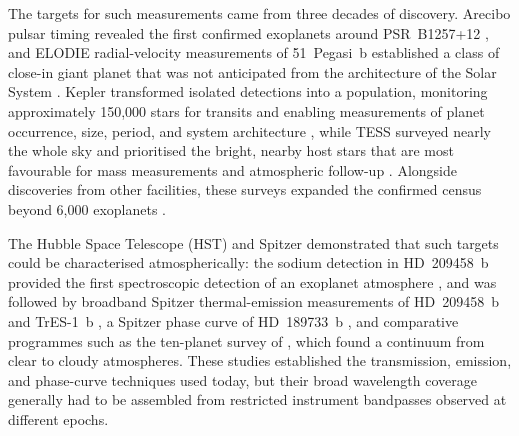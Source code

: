 The targets for such measurements came from three decades of discovery.
Arecibo pulsar timing revealed the first confirmed exoplanets around
PSR~B1257+12 \citep{WolszczanFrail1992}, and ELODIE radial-velocity
measurements of 51~Pegasi~b established a class of close-in giant planet that
was not anticipated from the architecture of the Solar System
\citep{MayorQueloz1995}. Kepler transformed
isolated detections into a population, monitoring approximately 150,000 stars
for transits and enabling measurements of planet occurrence, size, period, and
system architecture \citep{BoruckiEtAl2010,WinnFabrycky2015}, while TESS
surveyed nearly the whole sky and prioritised the bright, nearby host stars
that are most favourable for mass measurements and atmospheric follow-up
\citep{RickerEtAl2015}. Alongside discoveries from other facilities, these
surveys expanded the confirmed census beyond 6,000 exoplanets
\citep{NASAExoplanetArchive2026}.


The Hubble Space Telescope (HST) and Spitzer demonstrated that such targets
could be characterised atmospherically: the sodium detection in HD~209458~b
provided the first spectroscopic detection of an exoplanet atmosphere
\citep{CharbonneauEtAl2002}, and was followed by broadband Spitzer
thermal-emission measurements of HD~209458~b and TrES-1~b
\citep{DemingEtAl2005,CharbonneauEtAl2005}, a Spitzer phase curve of
HD~189733~b \citep{KnutsonEtAl2007}, and comparative programmes such as the
ten-planet survey of \citet{SingEtAl2016}, which found a continuum from clear
to cloudy atmospheres. These studies established the transmission, emission,
and phase-curve techniques used today, but their broad wavelength coverage
generally had to be assembled from restricted instrument bandpasses observed
at different epochs.


